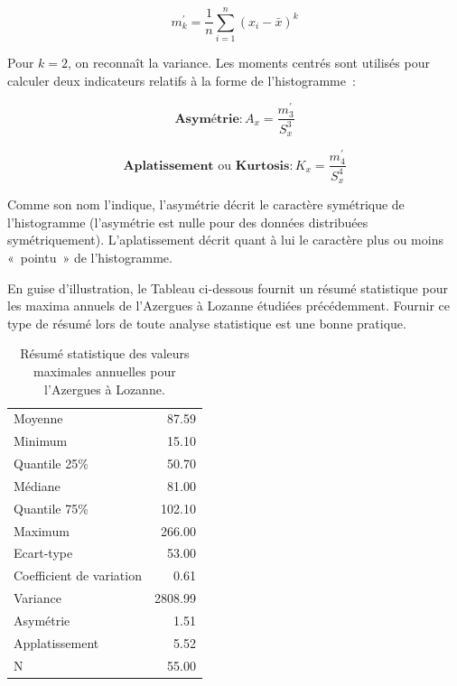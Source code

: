\documentclass[
]{book}
\begin{document}
\begin{equation} 
m^\prime_k=\frac{1}{n}\sum_{i=1}^{n}(x_i-\bar{x})^k
\label{eq:cmoment}
\end{equation}

Pour \(k=2\), on reconnaît la variance. Les moments centrés sont utilisés pour calculer deux indicateurs relatifs à la forme de l'histogramme~:

\begin{equation} 
\textbf{Asymétrie}: A_x=\frac{m^\prime_3}{S_x^3}
\label{eq:skew}
\end{equation}

\begin{equation} 
\textbf{Aplatissement} \text{ ou } \textbf{Kurtosis} : K_x=\frac{m^\prime_4}{S_x^4}
\label{eq:kurt}
\end{equation}

Comme son nom l'indique, l'asymétrie décrit le caractère symétrique de l'histogramme (l'asymétrie est nulle pour des données distribuées symétriquement). L'aplatissement décrit quant à lui le caractère plus ou moins «~pointu~» de l'histogramme.

En guise d'illustration, le Tableau ci-dessous fournit un résumé statistique pour les maxima annuels de l'Azergues à Lozanne étudiées précédemment. Fournir ce type de résumé lors de toute analyse statistique est une bonne pratique.

\begin{table}
\centering
\caption{\label{tab:summaryTable}Résumé statistique des valeurs maximales annuelles pour l’Azergues à Lozanne.}
\centering
\begin{tabular}[t]{lr}
\toprule
Moyenne & 87.59\\
Minimum & 15.10\\
Quantile 25\% & 50.70\\
Médiane & 81.00\\
Quantile 75\% & 102.10\\
\addlinespace
Maximum & 266.00\\
Ecart-type & 53.00\\
Coefficient de variation & 0.61\\
Variance & 2808.99\\
Asymétrie & 1.51\\
\addlinespace
Applatissement & 5.52\\
N & 55.00\\
\bottomrule
\end{tabular}
\end{table}
\end{document}
